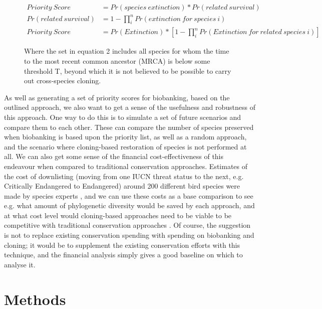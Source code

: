 \documentclass[10pt]{article}
\begin{document}
	\begin{figure}
	\begin{align}
			Priority\ Score &= Pr(species\ extinction) * Pr(related\ survival) \\
			Pr(related\ survival) &= 1 - \prod_{i}^{n}{Pr(extinction\ for\ species\ i)} \\
			Priority\ Score &= Pr(Extinction) * [1 - \prod_{i}^{n}{Pr(Extinction\ for\ related\ species\ i)}]
	\end{align}
	\caption{Where the set in equation 2 includes all species for whom the time to the most recent common ancestor (MRCA) is below some threshold T, beyond which it is
			not believed to be possible to carry out cross-species cloning.}
	\end{figure}
	
	As well as generating a set of priority scores for biobanking, based on the
	outlined approach, we also want to get a sense of the usefulness and
	robustness of this approach. One way to do this is to simulate a set of future
	scenarios and compare them to each other. These can compare the number of species
	preserved when biobanking is based upon the priority list, as well as a random
	approach, and the scenario where cloning-based restoration of species is not
	performed at all. We can also get some sense of the financial cost-effectiveness of
	this endeavour when compared to traditional conservation approaches. Estimates of the
	cost of downlisting (moving from one IUCN threat status to the next, e.g. Critically
	Endangered to Endangered) around 200 different bird species were made by
	species experts \cite{mccarthyFinancialCostsMeeting2012}, and we can use these costs as a base comparison to see e.g. what
	amount of phylogenetic diversity would be saved by each approach, and at what
	cost level would cloning-based approaches need to be viable to be competitive
	with traditional conservation approaches \cite{nunesPriceConservingAvian2015}. Of course, the suggestion is not to replace
	existing conservation spending with spending on biobanking and cloning; it would
	be to supplement the existing conservation efforts with this technique, and the
	financial analysis simply gives a good baseline on which to analyse it.

	
	
	
	\section{Methods}
\end{document}
